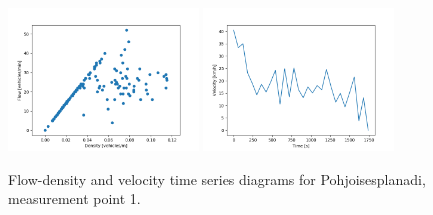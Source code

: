\documentclass[english, 12pt, a4paper, elec, utf8, pdfa, online]{aaltothesis}
\begin{document}
\begin{figure}[ht!]
    \centering
    \includegraphics[width=0.45\textwidth]{graphs/Pohjoisesplanadi_1_flw_dns.png}
    \includegraphics[width=0.45\textwidth]{graphs/Pohjoisesplanadi_1_spd_time_6.png}
    \caption{Flow-density and velocity time series diagrams for Pohjoisesplanadi, measurement point 1.}
\end{figure}
\end{document}
